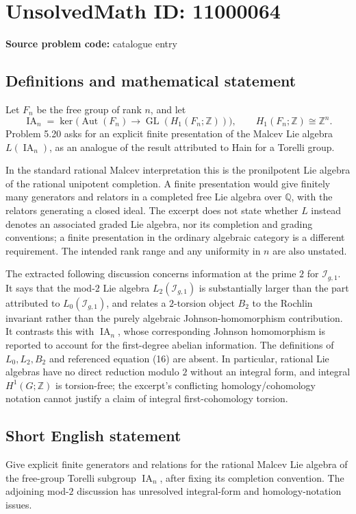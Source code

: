 \documentclass[11pt]{article}
\newcommand{\Z}{\mathbb{Z}}
\newcommand{\Q}{\mathbb{Q}}
\begin{document}
\section*{UnsolvedMath ID: 11000064}
\textbf{Source problem code:} catalogue entry
\subsection{Definitions and mathematical statement}
Let $F_n$ be the free group of rank $n$, and let
\[
 \operatorname{IA}_n=\ker\bigl(\operatorname{Aut}(F_n)
 \longrightarrow\operatorname{GL}(H_1(F_n;\Z))\bigr),
 \qquad H_1(F_n;\Z)\cong\Z^n.
\]
Problem 5.20 asks for an explicit finite presentation of the Malcev Lie algebra $L(\operatorname{IA}_n)$, as an analogue of the result attributed to Hain for a Torelli group.

In the standard rational Malcev interpretation this is the pronilpotent Lie algebra of the rational unipotent completion. A finite presentation would give finitely many generators and relators in a completed free Lie algebra over $\Q$, with the relators generating a closed ideal. The excerpt does not state whether $L$ instead denotes an associated graded Lie algebra, nor its completion and grading conventions; a finite presentation in the ordinary algebraic category is a different requirement. The intended rank range and any uniformity in $n$ are also unstated.

The extracted following discussion concerns information at the prime $2$ for $\mathcal I_{g,1}$. It says that the mod-$2$ Lie algebra $L_2(\mathcal I_{g,1})$ is substantially larger than the part attributed to $L_0(\mathcal I_{g,1})$, and relates a $2$-torsion object $B_2$ to the Rochlin invariant rather than the purely algebraic Johnson-homomorphism contribution. It contrasts this with $\operatorname{IA}_n$, whose corresponding Johnson homomorphism is reported to account for the first-degree abelian information. The definitions of $L_0,L_2,B_2$ and referenced equation (16) are absent. In particular, rational Lie algebras have no direct reduction modulo $2$ without an integral form, and integral $H^1(G;\Z)$ is torsion-free; the excerpt's conflicting homology/cohomology notation cannot justify a claim of integral first-cohomology torsion.
\subsection{Short English statement}
Give explicit finite generators and relations for the rational Malcev Lie algebra of the free-group Torelli subgroup $\operatorname{IA}_n$, after fixing its completion convention. The adjoining mod-$2$ discussion has unresolved integral-form and homology-notation issues.
\end{document}
